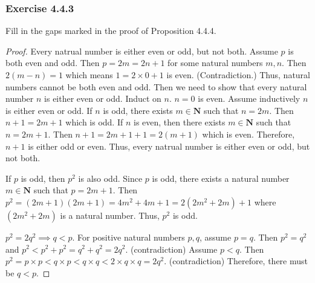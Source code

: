 \documentclass[12pt, letter]{article}
\begin{document}
\subsubsection*{Exercise 4.4.3}
Fill in the gaps marked in the proof of Proposition 4.4.4.
\begin{proof}
    Every natrual number is either even or odd, but not both. Assume $p$ is both even and odd. Then $p=2m=2n+1$ for some natural numbers $m,n$. 
    Then $2(m-n)=1$ which means $1=2\times 0+1$ is even. (Contradiction.) Thus, natural numbers cannot be both even and odd. Then we need to show that every natural number $n$ is either 
    even or odd. Induct on $n$. $n=0$ is even. Assume inductively $n$ is either even or odd. If $n$ is odd, there exists $m\in\mathbf{N}$ such that $n=2m$. Then $n+1=2m+1$ which is odd.
    If $n$ is even, then there exists $m\in\mathbf{N}$ such that $n=2m+1$. Then $n+1=2m+1+1=2(m+1)$ which is even. Therefore, $n+1$ is either odd or even. 
    Thus, every natrual number is either even or odd, but not both.

    If $p$ is odd, then $p^2$ is also odd. Since $p$ is odd, there exists a natural number $m\in\mathbf{N}$ such that $p=2m+1$. Then $p^2=(2m+1)(2m+1)=4m^2+4m+1=2(2m^2+2m)+1$ where $(2m^2+2m)$
    is a natural number. Thus, $p^2$ is odd.

    $p^2=2q^2\implies q<p$. For positive natural numbers $p,q$, assume $p=q$. Then $p^2=q^2$ and $p^2<p^2+p^2=q^2+q^2=2q^2$. (contradiction)
    Assume $p<q$. Then $p^2=p\times p<q\times p<q\times q<2\times q\times q=2q^2$. (contradiction) Therefore, there must be $q<p$.
\end{proof}
\end{document}

